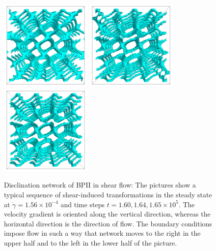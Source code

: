 \documentclass[aps,pre,reprint,superscriptaddress, twocolumn]{revtex4}
\newcommand{\e}[1]{\times10^{#1}}
\newcommand{\gd}{\dot{\gamma}}
\begin{document}
\begin{figure}[htpb]
\includegraphics[width=0.4\textwidth]{disc-160k_run902.png}
\includegraphics[width=0.4\textwidth]{disc-164k_run902.png}
\includegraphics[width=0.4\textwidth]{disc-165k_run902.png}
\caption{Disclination network of BPII in shear flow: The pictures show a typical sequence 
of shear-induced transformations in the steady state at 
$\gd=1.56\e{-4}$ and time steps $t=1.60, 1.64,1.65\e{5}$. The velocity gradient 
is oriented along the vertical direction, whereas the horizontal direction is the direction of flow. The boundary conditions impose flow in such a way that network moves 
to the right in the upper half and to the left in the lower half of the picture.}
\label{bp2-med}
\end{figure}
\end{document}
